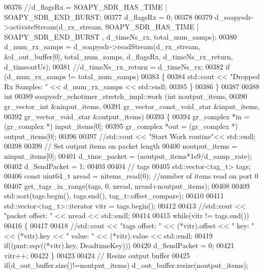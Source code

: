 \begin{DoxyCode}
00376       \textcolor{comment}{//d\_flagsRx =  SOAPY\_SDR\_HAS\_TIME | SOAPY\_SDR\_END\_BURST;}
00377       d_flagsRx =  0;
00378 
00379       d_soapysdr->activateStream(d_rx_stream, SOAPY_SDR_HAS_TIME | 
      SOAPY_SDR_END_BURST , d_timeNs_rx, total\_num\_samps);
00380       d_num_rx_samps = d_soapysdr->readStream(d_rx_stream, &d_out_buffer[0], total\_num\_samps, 
      d_flagsRx, d_timeNs_rx_return, d\_timeoutUs);
00381       \textcolor{comment}{//d\_timeNs\_rx\_return = d\_timeNs\_rx;}
00382       \textcolor{keywordflow}{if} (d_num_rx_samps != total\_num\_samps)
00383       \{
00384       std::cout << \textcolor{stringliteral}{"Dropped Rx Samples: "} << d_num_rx_samps << std::endl;
00385       \}
00386     \}
00387 
00388     \textcolor{keywordtype}{int}
00389     soapysdr_echotimer_stretch_impl::work (\textcolor{keywordtype}{int} noutput\_items,
00390                        gr\_vector\_int &ninput\_items,
00391                        gr\_vector\_const\_void\_star &input\_items,
00392                        gr\_vector\_void\_star &output\_items)
00393     \{
00394       gr\_complex *in = (gr\_complex *) input\_items[0];
00395       gr\_complex *out = (gr\_complex *) output\_items[0];
00396 
00397       \textcolor{comment}{//std::cout << "Start Work routine"<< std::endl;}
00398 
00399       \textcolor{comment}{// Set output items on packet length}
00400       noutput\_items = ninput\_items[0];
00401       d_time_packet = (noutput\_items*1e9/d_samp_rate);
00402       d_SendPacket = 1;
00403 
00404       \textcolor{comment}{// tags}
00405       std::vector<tag\_t> tags;
00406       \textcolor{keyword}{const} uint64\_t nread = nitems\_read(0); \textcolor{comment}{//number of items read on port 0}
00407       get\_tags\_in\_range(tags, 0, nread, nread+noutput\_items);
00408 
00409       std::sort(tags.begin(), tags.end(), tag\_t::offset\_compare);
00410 
00411       std::vector<tag\_t>::iterator vitr = tags.begin();
00412 
00413       \textcolor{comment}{//std::cout << "packet offset: " << nread << std::endl;}
00414 
00415       \textcolor{keywordflow}{while}(vitr != tags.end())
00416       \{
00417 
00418         \textcolor{comment}{//std::cout << "tags offset: " << (*vitr).offset << " key: " << (*vitr).key << " value: " <<
       (*vitr).value << std::endl;}
00419         \textcolor{keywordflow}{if}((pmt::eqv((*vitr).key, DeadtimeKey)))
00420             d_SendPacket = 0;
00421         vitr++;
00422       \}
00423 
00424       \textcolor{comment}{// Resize output buffer}
00425       \textcolor{keywordflow}{if}(d_out_buffer.size()!=noutput\_items) d_out_buffer.resize(noutput\_items);

\end{DoxyCode}
